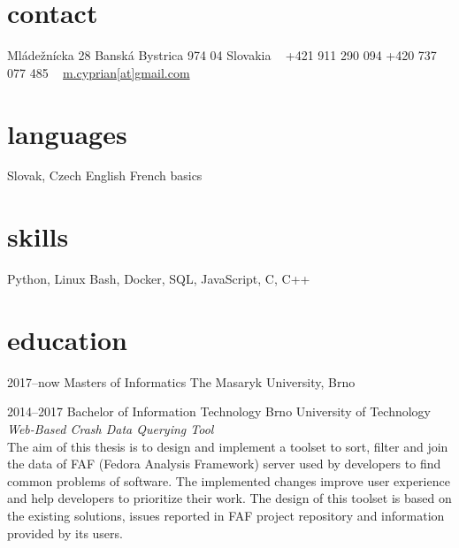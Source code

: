 \documentclass[]{friggeri-cv} %
\begin{document}


\begin{aside} %
\section{contact}
Mládežnícka 28
Banská Bystrica 974 04
Slovakia
~
+421 911 290 094
+420 737 077 485
~
\href{mailto:m.cyprian@gmail.com}{m.cyprian[at]gmail.com}
\section{languages}
Slovak, Czech
English
French basics
\section{skills}
Python, Linux
Bash, Docker, SQL, JavaScript, C, C++
\end{aside}


\section{education}

\begin{entrylist}


\entry
{2017--now}
{Masters {\normalfont of Informatics}}
{The Masaryk University, Brno}


\entry
{2014--2017}
{Bachelor {\normalfont of Information Technology}}
{Brno University of Technology}
{\emph{Web-Based Crash Data Querying Tool} \\ The aim of this thesis is to design and implement a toolset to sort, filter and join the data of FAF (Fedora Analysis Framework) server used by developers to find common problems of software. The implemented changes improve user experience and help developers to prioritize their work. The design of this toolset is based on the existing solutions, issues reported in FAF project repository and information provided by its users.}


\end{entrylist}
\end{document}
